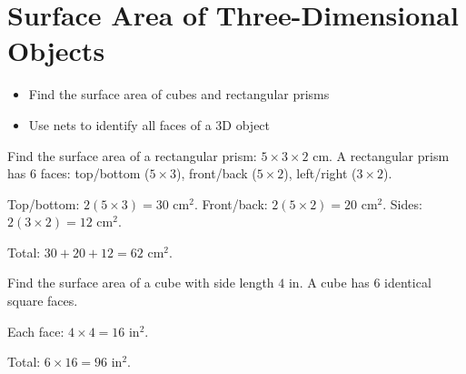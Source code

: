 \section{Surface Area of Three-Dimensional Objects}

\begin{stepGoal}
\begin{itemize}
    \item Find the surface area of cubes and rectangular prisms
    \item Use nets to identify all faces of a 3D object
\end{itemize}
\end{stepGoal}

\begin{stepVocabBox}
\end{stepVocabBox}

\begin{stepsCard}
\end{stepsCard}

\begin{stepExample}{Find the surface area of a rectangular prism: $5 \times 3 \times 2$ cm.}
     A rectangular prism has $6$ faces: top/bottom ($5 \times 3$), front/back ($5 \times 2$), left/right ($3 \times 2$).

     Top/bottom: $2(5 \times 3) = 30$ cm$^{2}$. \quad Front/back: $2(5 \times 2) = 20$ cm$^{2}$. \quad Sides: $2(3 \times 2) = 12$ cm$^{2}$.

     Total: $30 + 20 + 12 = 62$ cm$^{2}$.
\end{stepExample}

\begin{stepExample}{Find the surface area of a cube with side length $4$ in.}
     A cube has $6$ identical square faces.

     Each face: $4 \times 4 = 16$ in$^{2}$.

     Total: $6 \times 16 = 96$ in$^{2}$.
\end{stepExample}

